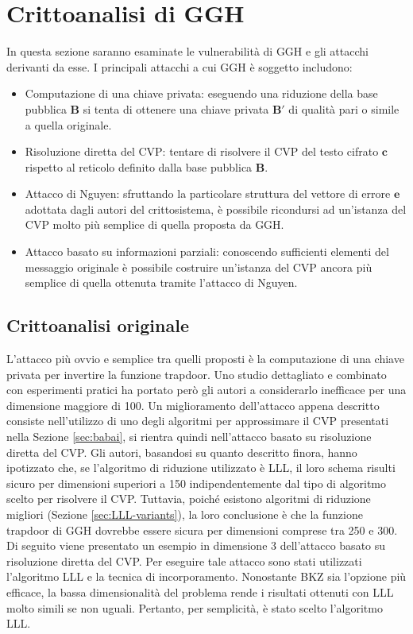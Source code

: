 \section{Crittoanalisi di GGH}
In questa sezione saranno esaminate le vulnerabilità di GGH e gli attacchi derivanti da esse. 
I principali attacchi a cui GGH è soggetto includono:
\begin{itemize}
\item Computazione di una chiave privata: eseguendo una riduzione della base pubblica $\mathbf{B}$
si tenta di ottenere una chiave privata $\mathbf{B}'$ di qualità pari o simile a quella originale. 
\item Risoluzione diretta del CVP: tentare di risolvere il CVP del testo cifrato $\mathbf{c}$ 
rispetto al reticolo definito dalla base pubblica $\mathbf{B}$. 
\item Attacco di Nguyen: sfruttando la particolare struttura del vettore di errore $\mathbf{e}$ 
adottata dagli autori del crittosistema, è possibile ricondursi ad un'istanza del CVP molto più 
semplice di quella proposta da GGH.
\item Attacco basato su informazioni parziali: conoscendo sufficienti elementi del messaggio
originale è possibile costruire un'istanza del CVP ancora più semplice di quella ottenuta
tramite l'attacco di Nguyen. 
\end{itemize}

\subsection{Crittoanalisi originale}
L'attacco più ovvio e semplice tra quelli proposti è la computazione di una chiave privata per invertire la
funzione trapdoor. Uno studio dettagliato e combinato con esperimenti pratici ha portato però 
gli autori a considerarlo inefficace per una dimensione maggiore di 100.
Un miglioramento dell'attacco appena descritto consiste nell'utilizzo di uno degli algoritmi
per approssimare il CVP presentati nella Sezione \ref{sec:babai}, si rientra quindi 
nell'attacco basato su risoluzione diretta del CVP. 
Gli autori, basandosi su quanto descritto finora, hanno ipotizzato che, se l'algoritmo di 
riduzione utilizzato è LLL, il loro schema risulti sicuro per dimensioni superiori a 150
indipendentemente dal tipo di algoritmo scelto per risolvere il CVP. 
Tuttavia, poiché esistono algoritmi di riduzione migliori (Sezione \ref{sec:LLL-variants}), 
la loro conclusione è che la funzione trapdoor di GGH dovrebbe essere sicura per dimensioni 
comprese tra 250 e 300. \\
Di seguito viene presentato un esempio in dimensione 3 dell'attacco basato su 
risoluzione diretta del CVP. 
Per eseguire tale attacco sono stati utilizzati l'algoritmo LLL e la tecnica di incorporamento. 
Nonostante BKZ sia l'opzione più efficace, la bassa 
dimensionalità del problema rende i risultati ottenuti con LLL molto simili se non uguali. 
Pertanto, per semplicità, è stato scelto l'algoritmo LLL.


